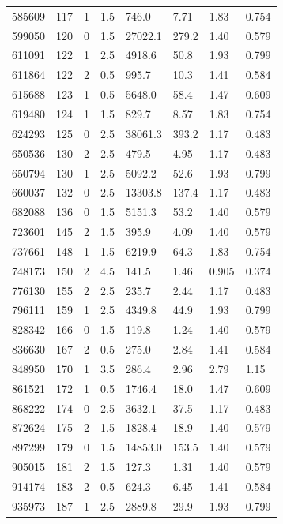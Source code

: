 \documentclass[preview]{standalone}
\begin{document}
{{{\begin{tabular}{L{1.2cm}C{1.2cm} C{0.3cm}C{0.5cm} C{1.4cm}C{1.4cm} C{1.4cm}C{1.4cm}}
  585609  &   117  & 1     & 1.5 &  746.0  & 7.71  & 1.83 &  0.754   \\ 
  599050  &   120  & 0     & 1.5 &  27022.1  & 279.2  & 1.40 &  0.579   \\ 
  611091  &   122  & 1     & 2.5 &  4918.6  & 50.8  & 1.93 &  0.799   \\ 
  611864  &   122  & 2     & 0.5 &  995.7  & 10.3  & 1.41 &  0.584   \\ 
  615688  &   123  & 1     & 0.5 &  5648.0  & 58.4  & 1.47 &  0.609   \\ 
  619480  &   124  & 1     & 1.5 &  829.7  & 8.57  & 1.83 &  0.754   \\ 
  624293  &   125  & 0     & 2.5 &  38061.3  & 393.2  & 1.17 &  0.483   \\ 
  650536  &   130  & 2     & 2.5 &  479.5  & 4.95  & 1.17 &  0.483   \\ 
  650794  &   130  & 1     & 2.5 &  5092.2  & 52.6  & 1.93 &  0.799   \\ 
  660037  &   132  & 0     & 2.5 &  13303.8  & 137.4  & 1.17 &  0.483   \\ 
  682088  &   136  & 0     & 1.5 &  5151.3  & 53.2  & 1.40 &  0.579   \\ 
  723601  &   145  & 2     & 1.5 &  395.9  & 4.09  & 1.40 &  0.579   \\ 
  737661  &   148  & 1     & 1.5 &  6219.9  & 64.3  & 1.83 &  0.754   \\ 
  748173  &   150  & 2     & 4.5 &  141.5  & 1.46  & 0.905 &  0.374   \\ 
  776130  &   155  & 2     & 2.5 &  235.7  & 2.44  & 1.17 &  0.483   \\ 
  796111  &   159  & 1     & 2.5 &  4349.8  & 44.9  & 1.93 &  0.799   \\ 
  828342  &   166  & 0     & 1.5 &  119.8  & 1.24  & 1.40 &  0.579   \\ 
  836630  &   167  & 2     & 0.5 &  275.0  & 2.84  & 1.41 &  0.584   \\ 
  848950  &   170  & 1     & 3.5 &  286.4  & 2.96  & 2.79 &  1.15   \\ 
  861521  &   172  & 1     & 0.5 &  1746.4  & 18.0  & 1.47 &  0.609   \\ 
  868222  &   174  & 0     & 2.5 &  3632.1  & 37.5  & 1.17 &  0.483   \\ 
  872624  &   175  & 2     & 1.5 &  1828.4  & 18.9  & 1.40 &  0.579   \\ 
  897299  &   179  & 0     & 1.5 &  14853.0  & 153.5  & 1.40 &  0.579   \\ 
  905015  &   181  & 2     & 1.5 &  127.3  & 1.31  & 1.40 &  0.579   \\ 
  914174  &   183  & 2     & 0.5 &  624.3  & 6.45  & 1.41 &  0.584   \\ 
  935973  &   187  & 1     & 2.5 &  2889.8  & 29.9  & 1.93 &  0.799   \\ 
\hline 
\end{tabular} 

}}}
\end{document}
